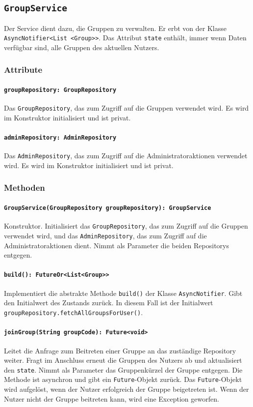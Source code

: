 \documentclass{entwurfsheft}
\begin{document}
\newpage
\subsection{\texttt{GroupService}}\label{sec:GroupService}
Der Service dient dazu, die Gruppen zu verwalten. Er erbt von der Klasse \texttt{AsyncNotifier<List <Group>>}. Das Attribut \texttt{state} enthält, immer wenn Daten verfügbar sind, alle Gruppen des aktuellen Nutzers.
\subsubsection*{Attribute}
\paragraph{\texttt{groupRepository: GroupRepository}}
Das \texttt{GroupRepository}, das zum Zugriff auf die Gruppen verwendet wird. Es wird im Konstruktor initialisiert und ist privat.
\paragraph{\texttt{adminRepository: AdminRepository}}
Das \texttt{AdminRepository}, das zum Zugriff auf die Administratoraktionen verwendet wird. Es wird im Konstruktor initialisiert und ist privat.
\subsubsection*{Methoden}
\paragraph{\texttt{GroupService(GroupRepository groupRepository): GroupService}}
Konstruktor. Initialisiert das \texttt{GroupRepository}, das zum Zugriff auf die Gruppen verwendet wird, und das \texttt{AdminRe\-pository}, das zum Zugriff auf die Administratoraktionen dient. Nimmt als Parameter die beiden Repositorys entgegen.
\paragraph{\texttt{build(): FutureOr<List<Group>>}}
Implementiert die abstrakte Methode \texttt{build()} der Klasse \texttt{AsyncNotifier}. Gibt den Initialwert des Zustands zurück. In diesem Fall ist der Initialwert \texttt{groupRepository.fetchAllGroupsForUser()}.
\paragraph{\texttt{joinGroup(String groupCode): Future<void>}}
Leitet die Anfrage zum Beitreten einer Gruppe an das zuständige Repository weiter. Fragt im Anschluss erneut die Gruppen des Nutzers ab und aktualisiert den \texttt{state}. Nimmt als Parameter das Gruppenkürzel der Gruppe entgegen. Die Methode ist asynchron und gibt ein \texttt{Future}-Objekt zurück. Das \texttt{Future}-Objekt wird aufgelöst, wenn der Nutzer erfolgreich der Gruppe beigetreten ist. Wenn der Nutzer nicht der Gruppe beitreten kann, wird eine Exception geworfen.
\end{document}
